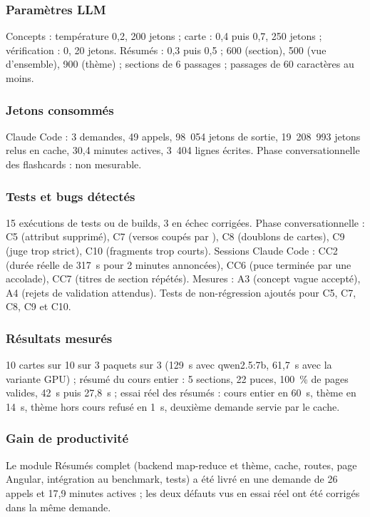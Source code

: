 \documentclass[12pt,a4paper]{report}
\DeclareRobustCommand{\code}[1]{\texttt{\codecasse{#1}}}
\begin{document}
\subsubsection{Paramètres LLM}
Concepts : température 0,2, 200 jetons ; carte : 0,4 puis 0,7, 250 jetons ; vérification : 0, 20 jetons.
Résumés : 0,3 puis 0,5 ; 600 (section), 500 (vue d'ensemble), 900 (thème) ; sections de 6 passages ;
passages de 60 caractères au moins.

\subsubsection{Jetons consommés}
Claude Code : 3 demandes, 49 appels, 98~054 jetons de sortie, 19~208~993 jetons relus en cache,
30,4 minutes actives, 3~404 lignes écrites. Phase conversationnelle des flashcards : non mesurable.

\subsubsection{Tests et bugs détectés}
15 exécutions de tests ou de builds, 3 en échec corrigées. Phase conversationnelle : C5 (attribut
\code{page} supprimé), C7 (versos coupés par \code{maxLength}), C8 (doublons de cartes), C9 (juge trop
strict), C10 (fragments trop courts). Sessions Claude Code : CC2 (durée réelle de 317~s pour 2 minutes
annoncées), CC6 (puce terminée par une accolade), CC7 (titres de section répétés). Mesures : A3 (concept
vague accepté), A4 (rejets de validation attendus). Tests de non-régression ajoutés pour C5, C7, C8, C9 et
C10.

\subsubsection{Résultats mesurés}
10 cartes sur 10 sur 3 paquets sur 3 (129~s avec qwen2.5:7b, 61,7~s avec la variante GPU) ; résumé du cours
entier : 5 sections, 22 puces, 100~\% de pages valides, 42~s puis 27,8~s ; essai réel des résumés : cours
entier en 60~s, thème en 14~s, thème hors cours refusé en 1~s, deuxième demande servie par le cache.

\subsubsection{Gain de productivité}
Le module Résumés complet (backend map-reduce et thème, cache, routes, page Angular, intégration au
benchmark, tests) a été livré en une demande de 26 appels et 17,9 minutes actives ; les deux défauts vus
en essai réel ont été corrigés dans la même demande.
\end{document}
